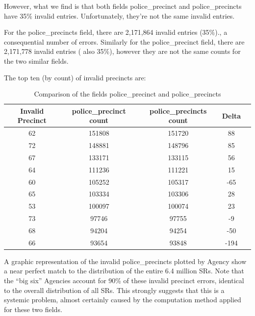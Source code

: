 \documentclass[12pt, titlepage]{article}
\begin{document}
	However, what we find is that both fields police\_precinct and police\_precincts  have  35\% invalid entries.
	Unfortunately, they're not the same invalid entries. 
	
	For the police\_precincts field, there are 2,171,864 invalid entries (35\%)., a consequential number of errors. Similarly for the police\_precinct field,
	 there are 2,171,778 invalid entries ( also 35\%), however they are not the same counts for the two similar fields.

	The top ten (by count) of invalid precincts are:

	\begin{table}[ht]
	\footnotesize
	\centering
		\begin{tabular}{ccccc}
		\toprule
		\textbf{Invalid Precinct} & \textbf{police\_precinct count} & \textbf{police\_precincts count} & \textbf{Delta}\\
		\midrule
			62 & 151808 & 151720 & 88 \\
			72 & 148881 & 148796 & 85 \\
			67 & 133171 & 133115 & 56 \\
			64 & 111236 & 111221 & 15 \\
			60 & 105252 & 105317 & -65 \\
			65 & 103334 & 103306 & 28 \\
			53 & 100097 & 100074 & 23 \\
			73 & 97746 & 97755 & -9 \\
			68 & 94204 & 94254 & -50 \\
			66 & 93654 & 93848 & -194 \\
		\bottomrule
		\end{tabular}
	\caption{Comparison of the fields police\_precinct and police\_precincts}
	\label{tab:comparison-precincts-diff}
	\end{table}
	
	A graphic representation of the invalid police\_precincts plotted by Agency show a near perfect match to the
	distribution of the entire 6.4 million SRs. Note that the ``big six'' Agencies account for 90\% of these invalid precinct errors, identical
	to the overall distribution of all SRs. This strongly suggests that this is a systemic problem, almost certainly
	caused by the computation method applied for these two fields.
	 
\end{document}
